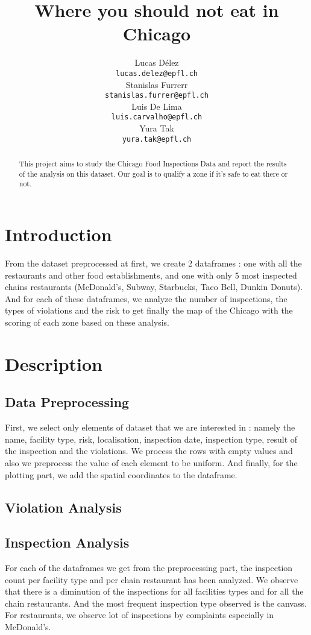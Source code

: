 \documentclass[11pt]{article}
\title{Where you should not eat in Chicago}
\author{Lucas Délez \\
  {\tt lucas.delez@epfl.ch} \\\And
  Stanislas Furrerr \\
  {\tt stanislas.furrer@epfl.ch} \\\And
  Luis De Lima \\
  {\tt luis.carvalho@epfl.ch} \\\And
  Yura Tak\\
{\tt yura.tak@epfl.ch} \\}
\date{}
\begin{document}
\maketitle
\begin{abstract}
  This project aims to study the Chicago Food Inspections Data and report the results of the analysis on this dataset. Our goal is to qualify a zone if it's safe to eat there or not.
\end{abstract}

\section{Introduction}

From the dataset preprocessed at first, we create 2 dataframes : one with all the restaurants and other food establishments, and one with only 5 most inspected chains restaurants (McDonald's, Subway, Starbucks, Taco Bell, Dunkin Donuts). And for each of these dataframes, we analyze the number of inspections, the types of violations and the risk to get finally the map of the Chicago with the scoring of each zone based on these analysis.

\section{Description}

\subsection{Data Preprocessing}
First, we select only elements of dataset that we are interested in : namely the name, facility type, risk, localisation, inspection date, inspection type, result of the inspection and the violations. We process the rows with empty values and also we preprocess the value of each element to be uniform. And finally, for the plotting part, we add the spatial coordinates to the dataframe.



\subsection{Violation Analysis}



\subsection{Inspection Analysis}
For each of the dataframes we get from the preprocessing part, the inspection count per facility type and per chain restaurant has been analyzed. We observe that there is a diminution of the inspections for all facilities types and for all the chain restaurants. And the most frequent inspection type observed is the canvass. For restaurants, we observe lot of inspections by complaints especially in McDonald's.
\end{document}
